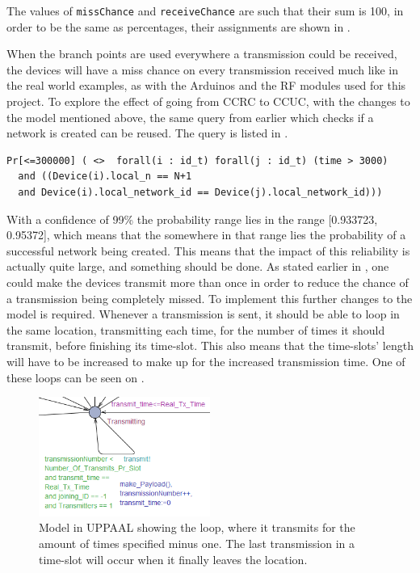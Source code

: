 \noindent
The values of \texttt{missChance} and \texttt{receiveChance} are such that their sum is 100, in order to be the same as percentages, their assignments are shown in .

When the branch points are used everywhere a transmission could be received, the devices will have a miss chance on every transmission received much like in the real world examples, as with the Arduinos and the RF modules used for this project. 
To explore the effect of going from CCRC to CCUC, with the changes to the model mentioned above, the same query from earlier which checks if a network is created can be reused. 
The query is listed in .

\begin{lstlisting}[style=UPPAAL, caption={Query for UPPAAL which asks for the probability of all devices in a network being equal to the number of devices in the system, and that they all have the same \texttt{network\_id}}, label={query-SuccesfulCreate}]
Pr[<=300000] ( <>  forall(i : id_t) forall(j : id_t) (time > 3000) 
  and ((Device(i).local_n == N+1 
  and Device(i).local_network_id == Device(j).local_network_id)))
\end{lstlisting}

\noindent
With a confidence of 99\% the probability range lies in the range [0.933723, 0.95372], which means that the somewhere in that range lies the probability of a successful network being created.
This means that the impact of this reliability is actually quite large, and something should be done.
As stated earlier in , one could make the devices transmit more than once in order to reduce the chance of a transmission being completely missed.
To implement this further changes to the model is required.
Whenever a transmission is sent, it should be able to loop in the same location, transmitting each time, for the number of times it should transmit, before finishing its time-slot. 
This also means that the time-slots' length will have to be increased to make up for the increased transmission time.
One of these loops can be seen on .

\begin{figure}
\centering
  \includegraphics[width=0.5\textwidth]{Figures/Model/Transmit_Loop.png} 
\caption{Model in UPPAAL showing the loop, where it transmits for the amount of times specified minus one. The last transmission in a time-slot will occur when it finally leaves the location.}
\label{LoopTransmitUPPAAL}
\end{figure}

